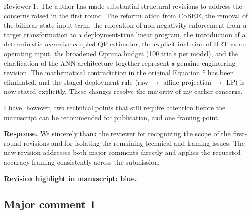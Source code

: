 \documentclass[11pt,a4paper]{article}
\newcommand{\revisionnotice}{\par\noindent\textcolor{revisionblue}{\textbf{Revision highlight in manuscript: blue.}}\par}
\begin{document}
\begin{reviewercomment}
Reviewer 1: The author has made substantial structural revisions to address the concerns raised in the first round. The reformulation from CoBRE, the removal of the bilinear state-input term, the relocation of non-negativity enforcement from a target transformation to a deployment-time linear program, the introduction of a deterministic recursive coupled-QP estimator, the explicit inclusion of HRT as an operating input, the broadened Optuna budget (100 trials per model), and the clarification of the ANN architecture together represent a genuine engineering revision. The mathematical contradiction in the original Equation 5 has been eliminated, and the staged deployment rule (raw $\rightarrow$ affine projection $\rightarrow$ LP) is now stated explicitly. These changes resolve the majority of my earlier concerns.

I have, however, two technical points that still require attention before the manuscript can be recommended for publication, and one framing point.
\end{reviewercomment}

\noindent\textbf{Response.} We sincerely thank the reviewer for recognizing the scope of the first-round revisions and for isolating the remaining technical and framing issues. The new revision addresses both major comments directly and applies the requested accuracy framing consistently across the submission.

\revisionnotice

\subsection*{Major comment 1}
\end{document}
